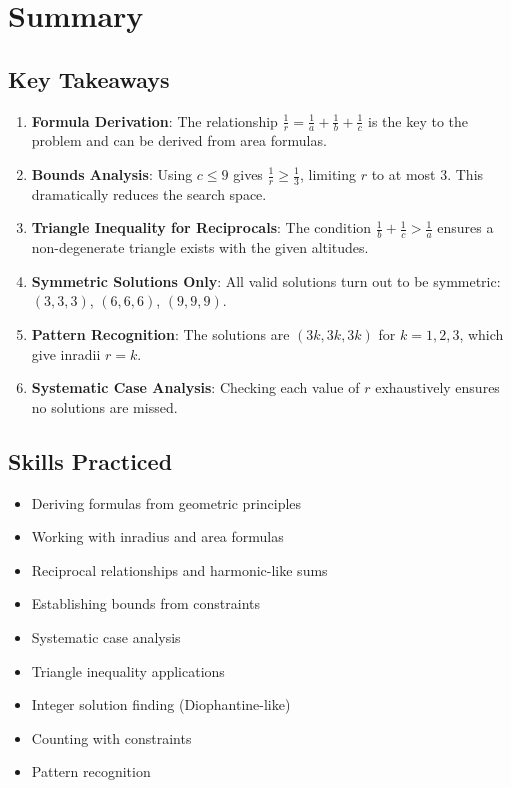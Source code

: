 \documentclass[12pt]{article}
\begin{document}
\section*{Summary}

\subsection*{Key Takeaways}

\begin{enumerate}
    \item \textbf{Formula Derivation}: The relationship $\frac{1}{r} = \frac{1}{a} + \frac{1}{b} + \frac{1}{c}$ is the key to the problem and can be derived from area formulas.
    
    \item \textbf{Bounds Analysis}: Using $c \leq 9$ gives $\frac{1}{r} \geq \frac{1}{3}$, limiting $r$ to at most 3. This dramatically reduces the search space.
    
    \item \textbf{Triangle Inequality for Reciprocals}: The condition $\frac{1}{b} + \frac{1}{c} > \frac{1}{a}$ ensures a non-degenerate triangle exists with the given altitudes.
    
    \item \textbf{Symmetric Solutions Only}: All valid solutions turn out to be symmetric: $(3,3,3)$, $(6,6,6)$, $(9,9,9)$.
    
    \item \textbf{Pattern Recognition}: The solutions are $(3k, 3k, 3k)$ for $k = 1, 2, 3$, which give inradii $r = k$.
    
    \item \textbf{Systematic Case Analysis}: Checking each value of $r$ exhaustively ensures no solutions are missed.
\end{enumerate}

\subsection*{Skills Practiced}

\begin{itemize}
    \item Deriving formulas from geometric principles
    \item Working with inradius and area formulas
    \item Reciprocal relationships and harmonic-like sums
    \item Establishing bounds from constraints
    \item Systematic case analysis
    \item Triangle inequality applications
    \item Integer solution finding (Diophantine-like)
    \item Counting with constraints
    \item Pattern recognition
\end{itemize}
\end{document}
